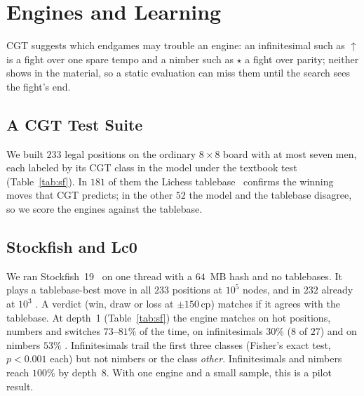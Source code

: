 \section{Engines and Learning}\label{sec:engines}

CGT suggests which endgames may trouble an engine: an infinitesimal such as ${\uparrow}$ is a fight over one
spare tempo and a nimber such as $\star$ a fight over parity; neither shows in the material, so a static
evaluation can miss them until the search sees the fight's end.

\subsection{A CGT Test Suite}

We built $233$ legal positions on the ordinary $8\times8$ board with at most seven men, each labeled by its CGT class in the model under the textbook test
(Table~\ref{tab:sf}). In $181$ of them the Lichess tablebase~\cite{LichessTB} confirms the winning moves that
CGT predicts; in the other $52$ the model and the tablebase disagree, so we score the engines against the
tablebase.

\subsection{Stockfish and Lc0}

We ran Stockfish~19~\cite{Stockfish} on one thread with a $64$~MB hash and no tablebases. It plays a tablebase-best move in all $233$
positions at $10^5$ nodes, and in $232$ already at $10^3$ . A verdict (win, draw or loss at $\pm150$\,cp) matches if it agrees with the tablebase.
At depth~1 (Table~\ref{tab:sf}) the engine matches on hot positions, numbers and switches $73$--$81\%$ of the time,
on infinitesimals $30\%$ ($8$ of $27$) and on nimbers $53\%$ . Infinitesimals trail the first three classes
(Fisher's exact test, $p<0.001$ each) but not nimbers or the class \emph{other}. Infinitesimals and nimbers reach
$100\%$ by depth~8.
With one engine and a small sample, this is a pilot result.

